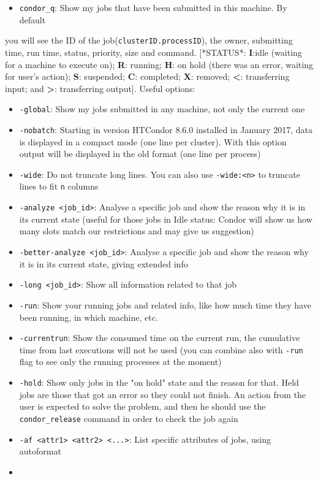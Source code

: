 \documentclass[a4paper,10pt]{article}
\begin{document}
\begin{itemize}
\item \texttt{condor\_q}: Show my jobs that have been submitted in this machine. By default
\end{itemize}
you will see the ID of the job(\texttt{clusterID.processID}), the owner, submitting
time, run time, status, priority, size and command. [*STATUS*: \textbf{I}:idle (waiting
for a machine to execute on); \textbf{R}: running; \textbf{H}: on hold (there was an error,
waiting for user's action); \textbf{S}: suspended; \textbf{C}: completed; \textbf{X}: removed; \textbf{<}:
transferring input; and \textbf{>}: transferring output]. Useful options:
\begin{itemize}
\item \texttt{-global}: Show my jobs submitted in any machine, not only the current one
\item \texttt{-nobatch}: Starting in version HTCondor 8.6.0 installed in January 2017,
data is displayed in a compact mode (one line per cluster). With this option
output will be displayed in the old format (one line per process)
\item \texttt{-wide}: Do not truncate long lines. You can also use \texttt{-wide:<n>} to
truncate lines to fit \texttt{n} columns
\item \texttt{-analyze <job\_id>}: Analyse a specific job and show the reason why it is in
its current state (useful for those jobs in Idle status: Condor will show us
how many slots match our restrictions and may give us suggestion)
\item \texttt{-better-analyze <job\_id>}: Analyse a specific job and show the reason why
it is in its current state, giving extended info
\item \texttt{-long <job\_id>}: Show all information related to that job
\item \texttt{-run}: Show your running jobs and related info, like how much time they
have been running, in which machine, etc.
\item \texttt{-currentrun}: Show the consumed time on the current run, the cumulative
time from last executions will not be used (you can combine also with \texttt{-run}
flag to see only the running processes at the moment)
\item \texttt{-hold}: Show only jobs in the "on hold" state and the reason for that. Held
jobs are those that got an error so they could not finish. An action from
the user is expected to solve the problem, and then he should use the
\texttt{condor\_release} command in order to check the job again
\item \texttt{-af <attr1> <attr2> <...>}: List specific attributes of jobs, using
autoformat
\item{}
\end{itemize}
\end{document}
